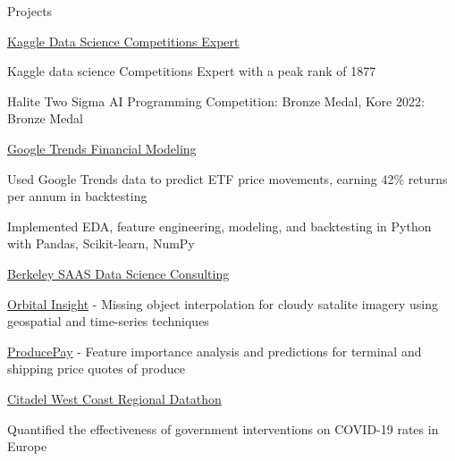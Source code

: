 \documentclass{resume} %
\begin{document}
\begin{rSection}{Projects}

\begin{rSubsection}{\href{https://www.kaggle.com/evilpegasus}{Kaggle Data Science Competitions Expert}}{}{}{}
    \item Kaggle data science Competitions Expert with a peak rank of 1877
    \item Halite Two Sigma AI Programming Competition: Bronze Medal, Kore 2022: Bronze Medal
\end{rSubsection}

\begin{rSubsection}{\href{https://github.com/evilpegasus/google-trends-financial-modeling/}{Google Trends Financial Modeling}}{}{}{}
    \item Used Google Trends data to predict ETF price movements, earning 42\% returns per annum in backtesting
    \item Implemented EDA, feature engineering, modeling, and backtesting in Python with Pandas, Scikit-learn, NumPy
\end{rSubsection}

\begin{rSubsection}{\href{https://www.producepay.com/}{Berkeley SAAS Data Science Consulting}}{}{}{}
    \item \href{https://orbitalinsight.com/}{Orbital Insight} - Missing object interpolation for cloudy satalite imagery using geospatial and time-series techniques
    \item \href{https://producepay.com/}{ProducePay} - Feature importance analysis and predictions for terminal and shipping price quotes of produce
\end{rSubsection}


\begin{rSubsection}{\href{https://github.com/evilpegasus/datathon-spring-2021}{Citadel West Coast Regional Datathon}}{}{}{}
    \item Quantified the effectiveness of government interventions on COVID-19 rates in Europe
\end{rSubsection}


\end{rSection}
\end{document}
